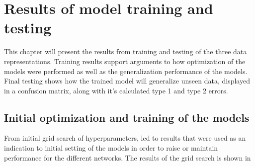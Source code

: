 
\chapter{Results of model training and testing}
This chapter will present the results from training and testing of the three data representations. Training results support arguments to how optimization of the models were performed as well as the generalization performance of the models. Final testing shows how the trained model will generalize unseen data, displayed in a confusion matrix, along with it's calculated type 1 and type 2 errors. 

\section{Initial optimization and training of the models}
From initial grid search of hyperparameters, led to results that were used as an indication to initial setting of the models in order to raise or maintain performance for the different networks. The results of the grid search is shown in %


